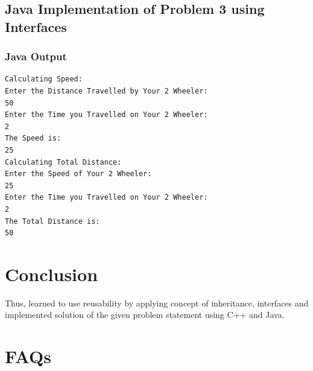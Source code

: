 \documentclass[11pt]{article}
\begin{document}
\subsection{Java Implementation of Problem 3 using Interfaces}






\subsubsection{Java Output}
\begin{lstlisting}[caption=Java Output for Program 3]
Calculating Speed:
Enter the Distance Travelled by Your 2 Wheeler:
50
Enter the Time you Travelled on Your 2 Wheeler:
2
The Speed is:
25
Calculating Total Distance:
Enter the Speed of Your 2 Wheeler:
25
Enter the Time you Travelled on Your 2 Wheeler:
2
The Total Distance is:
50
\end{lstlisting}

\pagebreak

\section{Conclusion}
Thus, learned to use reusability by applying concept of inheritance, interfaces and
implemented solution of the given problem statement using C++ and Java.

\section{FAQs}
\end{document}

